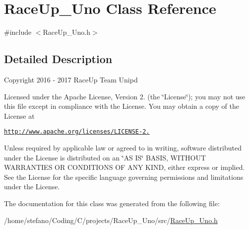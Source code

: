 \hypertarget{class_race_up___uno}{}\section{Race\+Up\+\_\+\+Uno Class Reference}
\label{class_race_up___uno}


{\ttfamily \#include $<$Race\+Up\+\_\+\+Uno.\+h$>$}



\subsection{Detailed Description}
Copyright 2016 -\/ 2017 Race\+Up Team Unipd

Licensed under the Apache License, Version 2. (the \char`\"{}\+License\char`\"{}); you may not use this file except in compliance with the License. You may obtain a copy of the License at

\href{http://www.apache.org/licenses/LICENSE-2.0}{\tt http\+://www.\+apache.\+org/licenses/\+L\+I\+C\+E\+N\+S\+E-\/2.}

Unless required by applicable law or agreed to in writing, software distributed under the License is distributed on an \char`\"{}\+A\+S I\+S\char`\"{} B\+A\+S\+IS, W\+I\+T\+H\+O\+UT W\+A\+R\+R\+A\+N\+T\+I\+ES OR C\+O\+N\+D\+I\+T\+I\+O\+NS OF A\+NY K\+I\+ND, either express or implied. See the License for the specific language governing permissions and limitations under the License. 

The documentation for this class was generated from the following file\+:\begin{DoxyCompactItemize}
\item 
/home/stefano/\+Coding/\+C/projects/\+Race\+Up\+\_\+\+Uno/src/\hyperlink{_race_up___uno_8h}{Race\+Up\+\_\+\+Uno.\+h}\end{DoxyCompactItemize}
